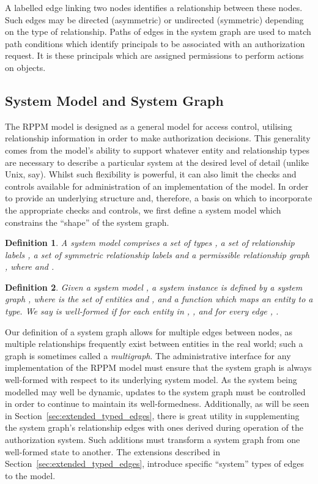 \documentclass{article}
\newtheorem{definition}{Definition}
\begin{document}
A labelled edge linking two nodes identifies a relationship between these nodes.
Such edges may be directed (asymmetric) or undirected (symmetric) depending on the type of relationship.
Paths of edges in the system graph are used to match path conditions which identify principals to be associated with an authorization request.
It is these principals which are assigned permissions to perform actions on objects.

\subsection{System Model and System Graph}\label{sec:model:system_graph}
The RPPM model is designed as a general model for access control, utilising relationship information in order to make authorization decisions.
This generality comes from the model's ability to support whatever entity and relationship types are necessary to describe a particular system at the desired level of detail (unlike Unix, say).
Whilst such flexibility is powerful, it can also limit the checks and controls available for administration of an implementation of the model.
In order to provide an underlying structure and, therefore, a basis on which to incorporate the appropriate checks and controls, we first define a system model which constrains the ``shape'' of the system graph.

\begin{definition}A \emph{system model} comprises a set of types , a set of relationship labels , a set of \emph{symmetric} relationship labels  and a \emph{permissible relationship graph} , where  and .
\end{definition}


\begin{definition}Given a system model , a \emph{system instance} is defined by a \emph{system graph} , where  is the set of entities and , and a function  which maps an entity to a type.
    We say  is \emph{well-formed} if for each entity  in , , and for every edge , .
\end{definition}

Our definition of a system graph allows for multiple edges between nodes, as multiple relationships frequently exist between entities in the real world; such a graph is sometimes called a \emph{multigraph}.
The administrative interface for any implementation of the RPPM model must ensure that the system graph is always well-formed with respect to its underlying system model.
As the system being modelled may well be dynamic, updates to the system graph must be controlled in order to continue to maintain its well-formedness.
Additionally, as will be seen in Section~\ref{sec:extended_typed_edges}, there is great utility in supplementing the system graph's relationship edges with ones derived during operation of the authorization system.
Such additions must transform a system graph from one well-formed state to another.
The extensions described in Section~\ref{sec:extended_typed_edges}, introduce specific ``system'' types of edges to the model.
\end{document}
